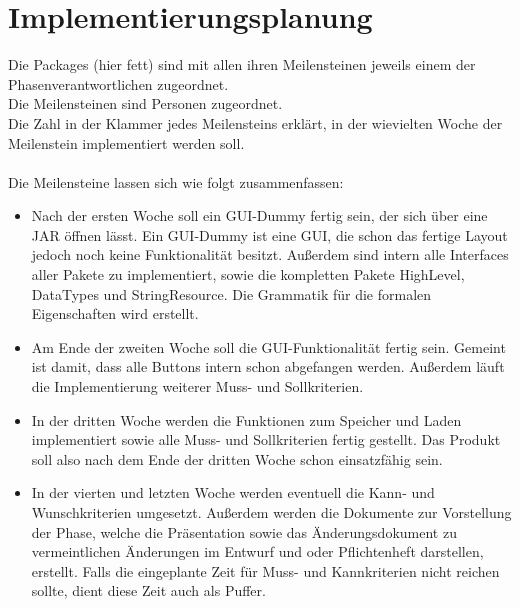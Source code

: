 \documentclass[a4paper]{scrreprt}
\begin{document}
\chapter{Implementierungsplanung}
Die Packages (hier fett) sind mit allen ihren Meilensteinen jeweils einem der Phasenverantwortlichen zugeordnet. \\
Die Meilensteinen sind Personen zugeordnet. \\
Die Zahl in der Klammer jedes Meilensteins erklärt, in der wievielten Woche der Meilenstein implementiert werden soll. \\\\

Die Meilensteine lassen sich wie folgt zusammenfassen: \\
\begin{itemize} 
\item Nach der ersten Woche soll ein GUI-Dummy fertig sein, der sich über eine JAR öffnen lässt. Ein GUI-Dummy ist eine GUI, die schon das fertige Layout jedoch noch keine Funktionalität besitzt. Außerdem sind intern alle Interfaces aller Pakete zu implementiert, sowie die kompletten Pakete HighLevel, DataTypes und StringResource. Die Grammatik für die formalen Eigenschaften wird erstellt.
\item Am Ende der zweiten Woche soll die GUI-Funktionalität fertig sein. Gemeint ist damit, dass alle Buttons intern schon abgefangen werden. Außerdem läuft die Implementierung weiterer Muss- und Sollkriterien. 
\item In der dritten Woche werden die Funktionen zum Speicher und Laden implementiert sowie alle Muss- und Sollkriterien fertig gestellt. Das Produkt soll also nach dem Ende der dritten Woche schon einsatzfähig sein.
\item In der vierten und letzten Woche werden eventuell die Kann- und Wunschkriterien umgesetzt. Außerdem werden die Dokumente zur Vorstellung der Phase, welche die Präsentation sowie das Änderungsdokument zu vermeintlichen Änderungen im Entwurf und oder Pflichtenheft darstellen, erstellt. Falls die eingeplante Zeit für Muss- und Kannkriterien nicht reichen sollte, dient diese Zeit auch als Puffer.


\end{itemize} 
\end{document}
